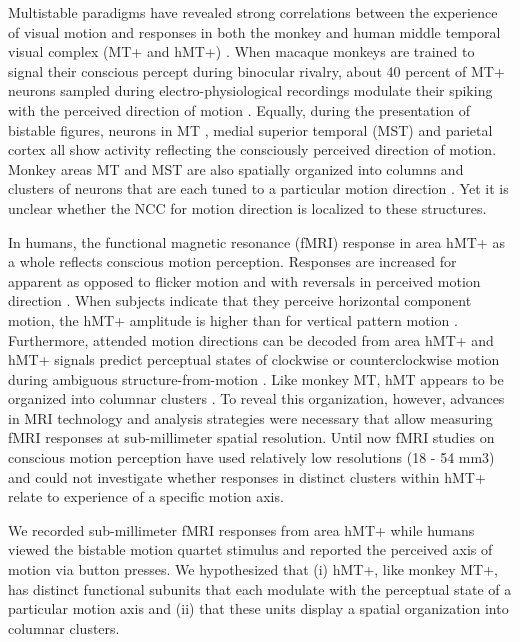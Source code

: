Multistable paradigms have revealed strong correlations between the experience of visual motion and responses in both the monkey and human middle temporal visual complex (MT+ and hMT+) \parencite{Leopold1999, Rees2007, Sterzer2009}. When macaque monkeys are trained to signal their conscious percept during binocular rivalry, about 40 percent of MT+ neurons sampled during electro-physiological recordings modulate their spiking with the perceived direction of motion \parencite{Logothetis1989, Leopold1999}. Equally, during the presentation of bistable figures, neurons in MT \parencite{Dodd2001}, medial superior temporal (MST) and parietal cortex \parencite{Williams2003} all show activity reflecting the consciously perceived direction of motion. Monkey areas MT and MST are also spatially organized into columns and clusters of neurons that are each tuned to a particular motion direction \parencite{Albright1984, Salzman1990, Britten1998}. Yet it is unclear whether the NCC for motion direction is localized to these structures.

In humans, the functional magnetic resonance (fMRI) response in area hMT+ as a whole reflects conscious motion perception. Responses are increased for apparent as opposed to flicker motion \parencite{Muckli2002} and with reversals in perceived motion direction \parencite{Sterzer2002}. When subjects indicate that they perceive horizontal component motion, the hMT+ amplitude is higher than for vertical pattern motion \parencite{Castelo-Branco2002}. Furthermore, attended motion directions can be decoded from area hMT+ \parencite{Kamitani2006} and hMT+ signals predict perceptual states of clockwise or counterclockwise motion during ambiguous structure-from-motion \parencite{Brouwer2007}. Like monkey MT, hMT appears to be organized into columnar clusters \parencite{Zimmermann2011}. To reveal this organization, however, advances in MRI technology \parencite{Ugurbil2003} and analysis strategies \parencite{Kemper2017,Polimeni2017} were necessary that allow measuring fMRI responses at sub-millimeter spatial resolution. Until now fMRI studies on conscious motion perception have used relatively low resolutions (18 - 54 mm3) and could not investigate whether responses in distinct clusters within hMT+ relate to experience of a specific motion axis.

We recorded sub-millimeter fMRI responses from area hMT+ while humans viewed the bistable motion quartet stimulus and reported the perceived axis of motion via button presses. We hypothesized that (i) hMT+, like monkey MT+, has distinct functional subunits that each modulate with the perceptual state of a particular motion axis and (ii) that these units display a spatial organization into columnar clusters.

